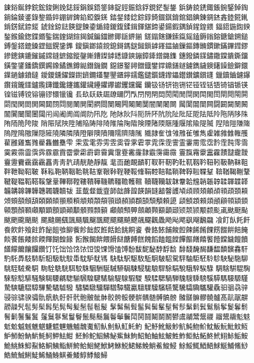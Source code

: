 鋉鋊鋋鋍鋎鋐鋑鋓鋔鋕鋖鋗鋘鋙鋚鋛鋜鋞鋠鋡鋢鋧鋩鋫鋬
鋲鋳鋴鋵鋷鋹鋺鋻鋽鋾鋿錀錂錃錄錅錉錊錋錌錍錎錏錑錓
錔錖錗錜錝錞錡錣錤錥錧錩錪錬錭錰錱錴錵錷錹錺錻錼錽
錿鍂鍄鍅鍈鍉鍊鍌鍎鍏鍐鍑鍒鍓鍕鍖鍗鍙鍚鍜鍝鍞鍟鍠鍡
鍢鍣鍦鍧鍨鍫鍭鍮鍯鍱鍲鍳鍴鍷鍸鍹鍻鍼鍽鍿鎀鎁鎃鎅鎆
鎈鎉鎋鎌鎍鎎鎐鎑鎒鎓鎔鎕鎗鎙鎚鎛鎜鎝鎞鎟鎠鎡鎤鎥鎨
鎫鎭鎯鎱鎲鎴鎶鎷鎹鎺鎻鎼鎽鎾鏀鏁鏂鏄鏅鏆鏉鏋鏎鏏鏐
鏒鏓鏔鏕鏙鏚鏛鏠鏣鏥鏦鏧鏩鏪鏫鏬鏭鏮鏯鏰鏱鏲鏳鏴鏶
鏸鏺鏻鏼鏽鏾鏿鐀鐁鐂鐄鐅鐆鐇鐈鐉鐊鐌鐍鐎鐏鐑鐕鐖鐗
鐚鐛鐜鐞鐟鐡鐢鐣鐤鐥鐩鐪鐫鐬鐭鐯鐰鐱鐴鐶鐷鐹鐻鐼鐽
鑀鑁鑂鑃鑅鑆鑇鑈鑉鑋鑍鑎鑏鑐鑑鑓鑕鑖鑗鑘鑙鑚鑛鑜鑝
鑞鑟鑡鑢鑤鑦鑧鑨鑩鑪鑬鑮鑯鑱鑳鑴鑵鑶鑸鑺鑻钀钁钂钃
钄钑钖钘铇铏铓铔铚铦铻锜锠锧锳锽镃镈镋镕镚镠镮镴镵
镸镹镺镻镼镽镾閁閄閅閇閈閊閍閐閒閕閖閗閙閚閛閜閝閞
閟閠関閦閧閪閮閯閰閱閳閴閵閷閸閺闀闁闂闄闅闇闉闍闎
闏闑闒闓闗闘闙闚闛闝闟闠闣闤闦闧闬闿阇阓阘阛阞阠阣
阤阥阦阧阨阩阫阬阭阯阰阷阸阹阺阾陁陃陊陎陏陑陒陓陖
陗陙陚陜陞陠陥陦陫陭陮陯陱陹険陻陼陾陿隀隁隂隃隄隇
隉隌隑隒隓隖隚隝隞隟隠隡隢隣隣隤隥隦隩隫隬隭隮隯隲
隵隷隺隿雂雃雈雊雋雐雑雓雔雗雘雚雝雞雟雡雤雥雦雧雫
雬雭雮雰雱雴雵雸雺雼雽雿霂霃霅霊霋霌霐霑霒霔霕霗霘
霙霚霛霝霟霠霡霢霣霤霥霦霨霩霫霬霮霯霱霳霴霵霶霷霺
霻霼霿靀靁靃靅靆靇靉靊靋靌靍靎靏靐⾭靑靔靕靗靘靜靝
靟靣靤靦靧靪靫靬靭靮靯靰靱靲靵靷靸靹靺靻靽靾靿鞀鞁
鞂鞃鞄鞆鞇鞈鞉鞊鞌鞎鞐鞓鞕鞖鞗鞙鞚鞛鞜鞝鞞鞟鞡鞢鞤
鞥鞧鞨鞩鞪鞬鞮鞰鞱鞳鞵鞶鞷鞸鞹鞺鞻鞼鞾鞿韀韁韂韄韅
韇韈韊韍韎韏韐韑韒韔韕韖韗韘韚韛韝韟韠韡韢韣韤韥韨
韮韯韰韱韲韴韷韸韹韺韻韼韽韾頀頄頉頋頍頔頕頖頙頚頛
頝頞頟頠頢頣頥頧頨頩頪頫頬頮頯頱頲頳頴頵頶頹頺頼頾
頿顀顁顂顃顄顅顇顈顉顊顋顏顐顑顒顕顖顗顚顜顝顟顠顡
顣顤顦顨顩顪顭顮顲颋颎颒颕颙颣颩颪颫颬颭颰颲颴颵颷
颸颹颺颻颽颾颿飀飁飂飃飅飇飉飊飋飌飍飏飐飔飖飗飜飝
飡飣飤飥飦飬飮飰飱飳飵飶飷飸飹飺飻飿餀餁餂餄餆餇餈
餋餎餏餔餕餖餗餙餚餜餝餟餠餢餣餤餥餦餧餩餪餫餬餭餯
餰餱餲餴餵餶餸餹餺餻餽饀饁饂饄饆饇饍饎饏饐饓饖饘饙
饚饛饝饟饠饡饤饦饳饸饹饻饾馂馃馉馌馎馚馛馜馝馞馟馠
馡馢馣馤馦馧馩馪馫馯馰馲馵馶馷馸馹馺馻馼馽馾馿駀駂
駃駄駅駆駇駈駉駊駋駌駍駎駏駓駖駗駚駜駞駠駣駤駥駦駧
駨駩駪駫駬駮駯駰駲駳駴駵駶駷駸駹駺駻駼駽駾騀騂騃騄
騆騇騈騉騊騋騌騐騑騒験騔騕騗騘騚騛騜騝騞騟騠騡騢騣
騤騥騦騧騨騩騪騬騯騱騲騳騴騵騹騺騻騼騽騿驆驇驈驉驋
驌驎驐驑驒驓驔驖驘驙驜驝驞驠驡驣驦驧驨驩驫驲骃骉骍
骎骔骕骙骦骩骪骫骬骭骮骲骳骴骵骹骻骽骾骿髃髄髆髇髈
髉髊髍髎髐髗髙髚髛髜髝髞髠髢髣髤髥髧髨髩髪髬髰髱髲
髳髴髵髶髷髸髺髼髽髾髿鬀鬁鬂鬄鬅鬇鬉鬊鬋鬌鬎鬐鬑鬒
鬔鬕鬖鬗鬘鬙鬛鬜鬝鬞鬠鬡鬤鬦鬨鬪鬫鬬鬭鬰鬳鬴鬵鬶鬷
鬸鬹鬺鬽鬾鬿魀魆魊魋魌魐魒魓魕魖魗魙魛魜魝魞魟魠魡
魢魣魤魥魦魧魨魩魪魫魬魭魮魰魱魲魳魵魶魸魹魺魻魼魽
魾魿鮀鮂鮄鮅鮆鮇鮈鮉鮊鮋鮌鮍鮏鮓鮔鮕鮖鮗鮘鮙鮛鮜鮟
鮠鮡鮢鮣鮤鮥鮦鮧鮨鮩鮬鮯鮰鮱鮲鮳鮴鮵鮶鮷鮸鮹鮺鮻鮼
鮽鮾鮿鯂鯃鯄鯅鯆鯈鯋鯌鯍鯎鯏鯐鯑鯒鯓鯕鯗鯘鯙鯚鯜鯞
